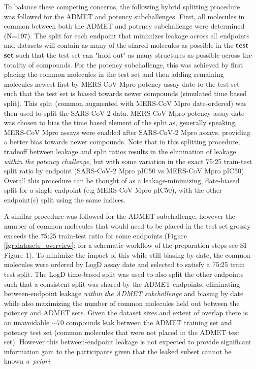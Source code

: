 \documentclass[journal=jcim,manuscript=article]{achemso}
\begin{document}
To balance these competing concerns, the following hybrid splitting procedure was followed for the ADMET and potency subchallenges. First, all molecules in common between both the ADMET and potency subchallenge were determined (N=197). The split for each endpoint that minimizes leakage across all endpoints and datasets will contain as many of the shared molecules as possible in the \textbf{test set} such that the test set can "hold out" as many structures as possible across the totality of compounds. For the potency subchallenge, this was achieved by first placing the common molecules in the test set and then adding remaining molecules newest-first by MERS-CoV Mpro potency assay date to the test set such that the test set is biased towards newer compounds (simulated time based split). This split (common augmented with MERS-CoV Mpro date-ordered) was then used to split the SARS-CoV-2 data. MERS-CoV Mpro potency assay date was chosen to bias the time based element of the split as, generally speaking, MERS-CoV Mpro assays were enabled after SARS-CoV-2 Mpro assays, providing a better bias towards newer compounds. Note that in this splitting procedure, tradeoff between leakage and split ratios results in the elimination of leakage \textit{within the potency challenge}, but with some variation in the exact 75:25 train-test split ratio by endpoint (SARS-CoV-2 Mpro pIC50 vs MERS-CoV Mpro pIC50). Overall this procedure can be thought of as a leakage-minimizing, date-biased split for a single endpoint (e.g MERS-CoV Mpro pIC50), with the other endpoint(s) split using the same indices.

A similar procedure was followed for the ADMET subchallenge, however the number of common molecules that would need to be placed in the test set grossly exceeds the 75:25 train-test ratio for some endpoints (Figure \ref{fgr:datasets_overview}; for a schematic workflow of the preparation steps see SI Figure 1). To minimize the impact of this while still biasing by date, the common molecules were ordered by LogD assay date and selected to satisfy a 75:25 train test split. The LogD time-based split was used to also split the other endpoints such that a consistent split was shared by the ADMET endpoints, eliminating between-endpoint leakage \textit{within the ADMET subchallenge} and biasing by date while also maximizing the number of common molecules held out between the potency and ADMET sets. Given the dataset sizes and extent of overlap there is an unavoidable $\sim$70 compounds leak between the ADMET training set and potency test set (common molecules that were not placed in the ADMET test set). However this between-endpoint leakage is not expected to provide significant information gain to the participants given that the leaked subset cannot be known \textit{a~priori}.
\end{document}
